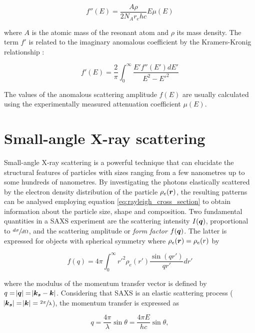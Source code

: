 \begin{equation}
        f'' (E) = \frac{A\rho}{2N_A r_e h c} E \mu(E)
\end{equation}

where $A$ is the atomic mass of the resonant atom and $\rho$ its mass density. The term $f'$ is related to the imaginary anomalous coefficient by the Kramers-Kronig relationship \citep{de_l._kronig_theory_1926,kramers_diffusion_1927}:

\begin{equation}
        f'(E) = \frac{2}{\pi} \int_0^{\infty} \frac{E'f''(E')dE'}{E^2 - E'^2}
\end{equation}

The values of the anomalous scattering amplitude $f(E)$ are usually calculated using the experimentally measured attenuation coefficient $\mu(E)$.

\section{Small-angle X-ray scattering}
\label{sec:SAXS_theory}

Small-angle X-ray scattering is a powerful technique that can elucidate the structural features of particles with sizes ranging from a few nanometres up to some hundreds of nanometres. By investigating the photons elastically scattered by the electron density distribution of the particle $\rho_e ( \bm{r} )$, the resulting patterns can be analysed employing equation \ref{eq:rayleigh_cross_section} to obtain information about the particle size, shape and composition. Two fundamental quantities in a SAXS experiment are the scattering intensity $I(\bm{q})$, proportional to $\sfrac{d\sigma}{d\Omega}$, and the scattering amplitude or \emph{form factor} $f(\bm{q})$. The latter is expressed for objects with spherical symmetry where $\rho_e(\bm{r})=\rho_e(r)$ by

\begin{equation}
        \label{eq:FormFactorSpherical}
        f(q)=4\pi \int_0^{\infty} r'^2 \rho_e(r')  \frac{\sin(qr')}{qr'}  dr'
\end{equation}

where the modulus of the momentum transfer vector is defined by $q=\abs{\bm{q}}=\abs{\bm{k_s} - \bm{k}}$. Considering that SAXS is an elastic scattering process ($\abs{\bm{k_s}}=\abs{\bm{k}}=\sfrac{2\pi}{\lambda}$), the momentum transfer is expressed as

\begin{equation}
q=\frac{4\pi }{\lambda}\sin\theta=\frac{4\pi E}{h c}\sin\theta ,
\end{equation}

